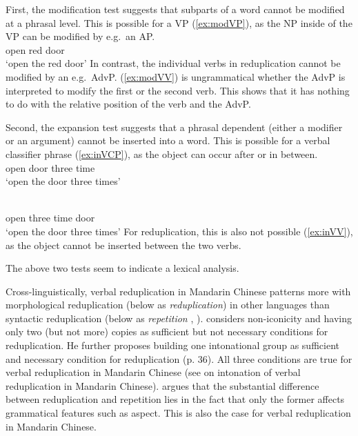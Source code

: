 First, the modification test suggests that subparts of a word cannot be modified at a phrasal level.
This is possible for a VP (\ref{ex:modVP}), as the NP inside of the VP can be modified by e.g.\ an AP.
\ea\label{ex:modVP} %
\gll {}  \\
open  red door\\
\glt `open the red door'
\z
In contrast, the individual verbs in reduplication cannot be modified by an e.g.\ AdvP.
(\ref{ex:modVV}) is ungrammatical whether the AdvP is interpreted to modify the first or the second verb.
This shows that it has nothing to do with the relative position of the verb and the AdvP.
\z


Second, the expansion test suggests that a phrasal dependent (either a modifier or an argument) cannot be inserted into a word.
This is possible for a verbal classifier phrase (\ref{ex:inVCP}), as the object can occur after or in between.
\ea\label{ex:inVCP}%
\ea \gll {}   \\
open door three time\\
\glt `open the door three times'

\ex  \gll {}    \\
open three time door\\
\glt `open the door three times'
\z\z
For reduplication, this is also not possible (\ref{ex:inVV}), as the object cannot be inserted between the two verbs.
\ea\label{ex:inVV}

\z\z
The above two tests seem to indicate a lexical analysis.

Cross-linguistically, verbal reduplication in Mandarin Chinese patterns more with morphological reduplication (below as \textit{reduplication}) in other languages
than syntactic reduplication (below as \textit{repetition} \citealt[31]{Gil2005}, \citealt[1--2]{Forza2016}).
\citet[35--36]{Gil2005} considers non-iconicity and having only two (but not more) copies as sufficient but not necessary conditions for reduplication.
He further proposes building one intonational group as sufficient and necessary condition for reduplication (p. 36).
All three conditions are true for verbal reduplication in Mandarin Chinese (see \citealt[154]{Sui2018} on intonation of verbal reduplication in Mandarin Chinese).
\citet[9]{Forza2016} argues that the substantial difference between reduplication and repetition lies in the fact that only the former affects grammatical features such as aspect.
This is also the case for verbal reduplication in Mandarin Chinese.

